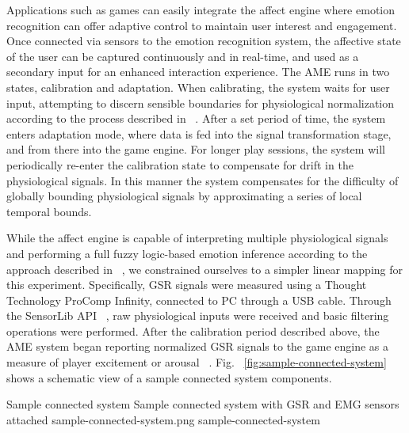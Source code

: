 
Applications such as games can easily integrate the affect engine where emotion recognition can offer adaptive control to maintain user interest and engagement. Once connected via sensors to the emotion recognition system, the affective state of the user can be captured continuously and in real-time, and used as a secondary input for an enhanced interaction experience. The AME runs in two states, calibration and adaptation. When calibrating, the system waits for user input, attempting to discern sensible boundaries for physiological normalization according to the process described in ~\cite{mandryk2007fuzzy}. After a set period of time, the system enters adaptation mode, where data is fed into the signal transformation stage, and from there into the game engine. For longer play sessions, the system will periodically re-enter the calibration state to compensate for drift in the physiological signals. In this manner the system compensates for the difficulty of globally bounding physiological signals by approximating a series of local temporal bounds.

While the affect engine is capable of interpreting multiple physiological signals and performing a full fuzzy logic-based emotion inference according to the approach described in ~\cite{mandryk2007fuzzy}, we constrained ourselves to a simpler linear mapping for this experiment. Specifically, GSR signals were measured using a Thought Technology ProComp Infinity, connected to PC through a USB cable. Through the SensorLib API ~\cite{nacke2011biofeedback}, raw physiological inputs were received and basic filtering operations were performed. After the calibration period described above, the AME system began reporting normalized GSR signals to the game engine as a measure of player excitement or arousal ~\cite{aggag2011affective, tijs2009creating}. Fig. ~\ref{fig:sample-connected-system} shows a schematic view of a sample connected system components.

\img
{Sample connected system}
{Sample connected system with GSR and EMG sensors attached}
{sample-connected-system.png}
{sample-connected-system}

